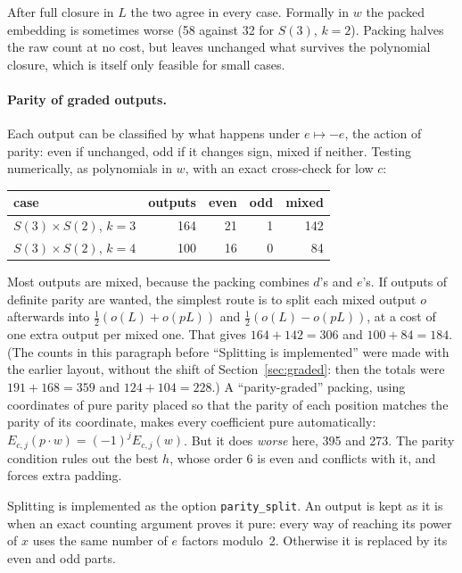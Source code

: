 \documentclass[11pt]{article}
\theoremstyle{definition}
\theoremstyle{remark}
\begin{document}
After full closure in $L$ the two agree in every case. Formally in $w$ the
packed embedding is sometimes worse (58 against 32 for $S(3)$, $k=2$). Packing
halves the raw count at no cost, but leaves unchanged what survives the
polynomial closure, which is itself only feasible for small cases.

\paragraph{Parity of graded outputs.}
Each output can be classified by what happens under $e \mapsto -e$, the action
of parity: even if unchanged, odd if it changes sign, mixed if neither. Testing
numerically, as polynomials in $w$, with an exact cross-check for low $c$:
\begin{center}
\begin{tabular}{lrrrr}
  case & outputs & even & odd & mixed \\ \hline
  $S(3)\times S(2)$, $k = 3$ & 164 & 21 & 1 & 142 \\
  $S(3)\times S(2)$, $k = 4$ & 100 & 16 & 0 & 84
\end{tabular}
\end{center}
Most outputs are mixed, because the packing combines $d$'s and $e$'s. If
outputs of definite parity are wanted, the simplest route is to split each
mixed output $o$ afterwards into $\tfrac12(o(L) + o(pL))$ and
$\tfrac12(o(L) - o(pL))$, at a cost of one extra output per mixed one. That
gives $164 + 142 = 306$ and $100 + 84 = 184$. (The counts in this paragraph
before ``Splitting is implemented'' were made with the earlier layout, without
the shift of Section~\ref{sec:graded}: then the totals were $191 + 168 = 359$
and $124 + 104 = 228$.) A ``parity-graded'' packing,
using coordinates of pure parity placed so that the parity of each position
matches the parity of its coordinate, makes every coefficient pure
automatically: $E_{c,j}(p\cdot w) = (-1)^j E_{c,j}(w)$. But it does
\emph{worse} here, 395 and 273. The parity condition rules out the best $h$,
whose order $6$ is even and conflicts with it, and forces extra padding.

Splitting is implemented as the option \texttt{parity\_split}. An output is
kept as it is when an exact counting argument proves it pure: every way of
reaching its power of $x$ uses the same number of $e$ factors modulo~2.
Otherwise it is replaced by its even and odd parts.
\end{document}
